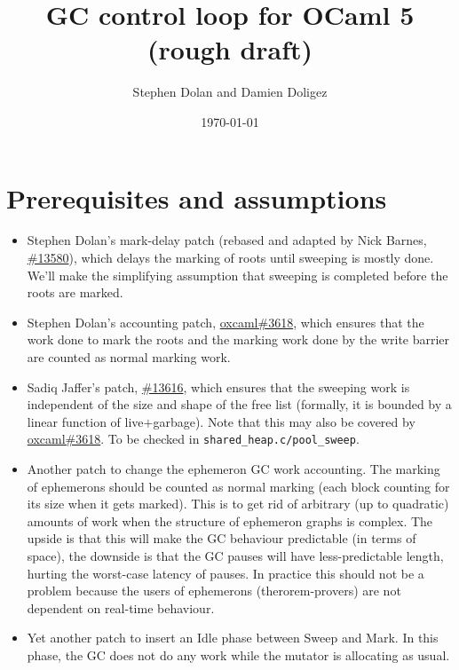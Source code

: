 \documentclass{article}
\begin{document}
\title{GC control loop for OCaml 5 (rough draft)}
\author{Stephen Dolan and Damien Doligez}
\date{\today}


\maketitle

\section{Prerequisites and assumptions}
\label{prerequisites}

\begin{itemize}
\item Stephen Dolan's mark-delay patch (rebased and adapted by Nick
Barnes, \href{https://github.com/ocaml/ocaml/pull/13580}{\#13580}),
which delays the marking of roots until sweeping is mostly done. We'll
make the simplifying assumption that sweeping is completed before the
roots are marked.
\item Stephen Dolan's accounting patch,
\href{https://github.com/oxcaml/oxcaml/pull/3618}{oxcaml\#3618}, which
ensures that the work done to mark the roots and the marking work done by the
write barrier are counted as normal marking work.
\item Sadiq Jaffer's patch,
\href{https://github.com/ocaml/ocaml/pull/13616}{\#13616}, which ensures that
the sweeping work is independent of the size and shape of the free
list (formally, it is bounded by a linear function of
live$+$garbage). Note that this may also be covered by
\href{https://github.com/oxcaml/oxcaml/pull/3618}{oxcaml\#3618}. To
be checked in \verb'shared_heap.c/pool_sweep'.
\item Another patch to change the ephemeron GC work accounting. The
marking of ephemerons should be counted as normal marking (each block
counting for its size when it gets marked). This is to get rid of
arbitrary (up to quadratic) amounts of work when the structure of
ephemeron graphs is complex. The upside is that this will make the GC
behaviour predictable (in terms of space), the downside is that the GC
pauses will have less-predictable length, hurting the worst-case
latency of pauses. In practice this should not be a problem because
the users of ephemerons (therorem-provers) are not dependent on
real-time behaviour.
\item Yet another patch to insert an Idle phase between Sweep and
Mark. In this phase, the GC does not do any work while the mutator is
allocating as usual.
\end{itemize}
\end{document}
